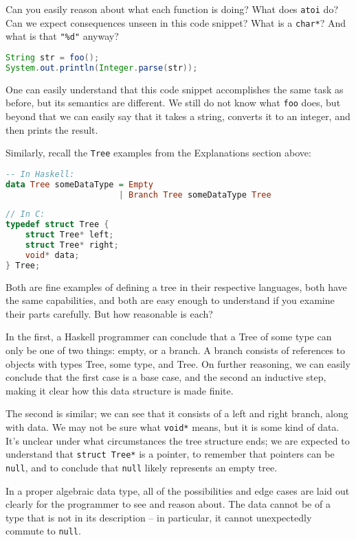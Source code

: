\documentclass[12pt,a4paper]{article}
\begin{document}
		Can you easily reason about what each function is doing? What does \texttt{atoi} do? Can we expect consequences unseen in this code snippet? What is a \texttt{char*}? And what is that \texttt{"\%d"} anyway? 
		
		\begin{lstlisting}[language=Java]
String str = foo();
System.out.println(Integer.parse(str));
		\end{lstlisting}
		
		One can easily understand that this code snippet accomplishes the same task as before, but its semantics are different. We still do not know what \texttt{foo} does, but beyond that we can easily say that it takes a string, converts it to an integer, and then prints the result.
		
		Similarly, recall the \texttt{Tree} examples from the Explanations section above:
		\begin{lstlisting}[language=Haskell]
-- In Haskell:
data Tree someDataType = Empty
                       | Branch Tree someDataType Tree
		\end{lstlisting}
		\begin{lstlisting}[language=C]
// In C:
typedef struct Tree {
	struct Tree* left;
	struct Tree* right;
	void* data;
} Tree;
		\end{lstlisting}
		
		Both are fine examples of defining a tree in their respective languages, both have the same capabilities, and both are easy enough to understand if you examine their parts carefully. But how reasonable is each?
		
		In the first, a Haskell programmer can conclude that a Tree of some type can only be one of two things: empty, or a branch. A branch consists of references to objects with types Tree, some type, and Tree. On further reasoning, we can easily conclude that the first case is a base case, and the second an inductive step, making it clear how this data structure is made finite.
		
		The second is similar; we can see that it consists of a left and right branch, along with data. We may not be sure what \texttt{void*} means, but it is some kind of data. It's unclear under what circumstances the tree structure ends; we are expected to understand that \texttt{struct Tree*} is a pointer, to remember that pointers can be \texttt{null}, and to conclude that \texttt{null} likely represents an empty tree.
		
		In a proper algebraic data type, all of the possibilities and edge cases are laid out clearly for the programmer to see and reason about. The data cannot be of a type that is not in its description -- in particular, it cannot unexpectedly commute to \texttt{null}.
		
\end{document}
